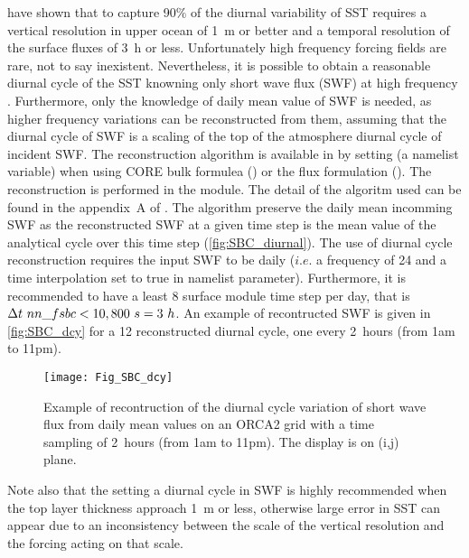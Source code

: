 \documentclass[../tex_main/NEMO_manual]{subfiles}
\begin{document}
\cite{Bernie_al_JC05} have shown that to capture 90$\%$ of the diurnal variability of 
SST requires a vertical resolution in upper ocean of 1~m or better and a temporal resolution 
of the surface fluxes of 3~h or less. Unfortunately high frequency forcing fields are rare, 
not to say inexistent. Nevertheless, it is possible to obtain a reasonable diurnal cycle 
of the SST knowning only short wave flux (SWF) at high frequency \citep{Bernie_al_CD07}.
Furthermore, only the knowledge of daily mean value of SWF is needed, 
as higher frequency variations can be reconstructed from them, assuming that 
the diurnal cycle of SWF is a scaling of the top of the atmosphere diurnal cycle 
of incident SWF. The \cite{Bernie_al_CD07} reconstruction algorithm is available
in \NEMO by setting  (a \textit{} namelist variable) when using 
CORE bulk formulea () or the flux formulation (). 
The reconstruction is performed in the  module. The detail of the algoritm used 
can be found in the appendix~A of \cite{Bernie_al_CD07}. The algorithm preserve the daily 
mean incomming SWF as the reconstructed SWF at a given time step is the mean value 
of the analytical cycle over this time step (\autoref{fig:SBC_diurnal}). 
The use of diurnal cycle reconstruction requires the input SWF to be daily 
($i.e.$ a frequency of 24 and a time interpolation set to true in  namelist parameter).
Furthermore, it is recommended to have a least 8 surface module time step per day,
that is  $\rdt \ nn\_fsbc < 10,800~s = 3~h$. An example of recontructed SWF 
is given in \autoref{fig:SBC_dcy} for a 12 reconstructed diurnal cycle, one every 2~hours 
(from 1am to 11pm).

\begin{figure}[!t]  \begin{center}
\texttt{[image: Fig\_SBC\_dcy]}
\caption{ \protect\label{fig:SBC_dcy}   
Example of recontruction of the diurnal cycle variation of short wave flux  
from daily mean values on an ORCA2 grid with a time sampling of 2~hours (from 1am to 11pm). 
The display is on (i,j) plane. }
\end{center}   \end{figure}

Note also that the setting a diurnal cycle in SWF is highly recommended  when 
the top layer thickness approach 1~m or less, otherwise large error in SST can 
appear due to an inconsistency between the scale of the vertical resolution 
and the forcing acting on that scale.
\end{document}
